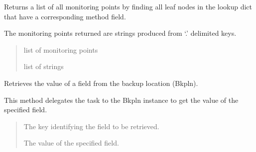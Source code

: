 \documentclass[letterpaper,10pt,english]{sphinxmanual}
\begin{document}
\begin{fulllineitems}
\begin{fulllineitems}
\label{\detokenize{apidocs:subrack_management_board.SubrackMngBoard.all_monitoring_points}}
\pysigstartsignatures
{}
\pysigstopsignatures
\sphinxAtStartPar
Returns a list of all monitoring points by finding all leaf nodes
in the lookup dict that have a corresponding method field.

\sphinxAtStartPar
The monitoring points returned are strings produced from ‘.’ delimited
keys.
\begin{quote}\begin{description}
\sphinxAtStartPar
list of monitoring points

\sphinxAtStartPar
list of strings

\end{description}\end{quote}

\end{fulllineitems}


\begin{fulllineitems}
\label{\detokenize{apidocs:subrack_management_board.SubrackMngBoard.bkpln_get_field}}
\pysigstartsignatures
{}
\pysigstopsignatures
\sphinxAtStartPar
Retrieves the value of a field from the backup location (Bkpln).

\sphinxAtStartPar
This method delegates the task to the Bkpln instance to get the value of
the specified field.
\begin{quote}\begin{description}
\sphinxAtStartPar
{} \textendash{} The key identifying the field to be retrieved.

\sphinxAtStartPar
The value of the specified field.

\end{description}\end{quote}

\end{fulllineitems}



\end{fulllineitems}
\end{document}
